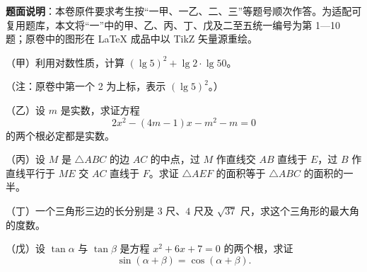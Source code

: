 

\begin{gktip}
\textbf{题面说明}：本卷原件要求考生按“一甲、一乙、二、三”等题号顺次作答。为适配可复用题库，本文将“一”中的甲、乙、丙、丁、戊及二至五统一编号为第 1—10 题；原卷中的图形在 LaTeX 成品中以 TikZ 矢量源重绘。
\end{gktip}


\begin{question}
（甲）利用对数性质，计算 $(\lg 5)^2+\lg 2\cdot\lg 50$。

（注：原卷中第一个 2 为上标，表示 $(\lg 5)^2$。）

\end{question}
\begin{question}
（乙）设 $m$ 是实数，求证方程
\[
2x^2-(4m-1)x-m^2-m=0
\]
的两个根必定都是实数。

\end{question}
\begin{question}
（丙）设 $M$ 是 $\triangle ABC$ 的边 $AC$ 的中点，过 $M$ 作直线交 $AB$ 直线于 $E$，过 $B$ 作直线平行于 $ME$ 交 $AC$ 直线于 $F$。求证 $\triangle AEF$ 的面积等于 $\triangle ABC$ 的面积的一半。

\end{question}
\begin{question}
（丁）一个三角形三边的长分别是 $3$ 尺、$4$ 尺及 $\sqrt{37}$ 尺，求这个三角形的最大角的度数。

\end{question}
\begin{question}
（戊）设 $\tan\alpha$ 与 $\tan\beta$ 是方程 $x^2+6x+7=0$ 的两个根，求证
\[
\sin(\alpha+\beta)=\cos(\alpha+\beta).
\]

\end{question}

